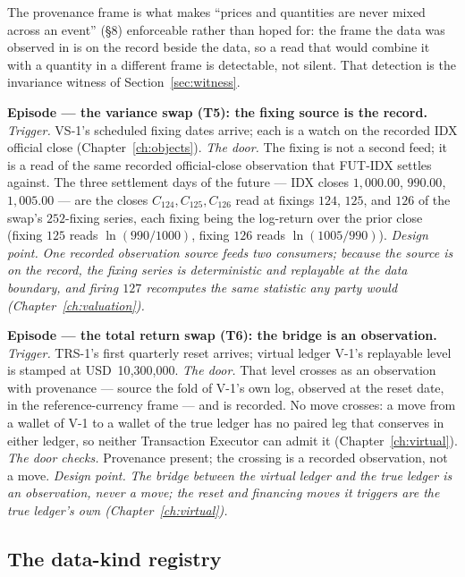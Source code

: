 \documentclass[11pt,a4paper]{article}
\newcommand{\USD}[1]{\mbox{USD~#1}}
\begin{document}
The provenance frame is what makes ``prices and quantities are never mixed across an
event'' (\S 8) enforceable rather than hoped for: the frame the data was observed in is on
the record beside the data, so a read that would combine it with a quantity in a
different frame is detectable, not silent. That detection is the invariance witness of
Section~\ref{sec:witness}.

\medskip\noindent\textbf{Episode --- the variance swap (T5): the fixing source is the
record.}
\emph{Trigger.} VS-1's scheduled fixing dates arrive; each is a watch on the recorded IDX
official close (Chapter~\ref{ch:objects}). \emph{The door.} The fixing is not a second
feed; it is a read of the same recorded official-close observation that FUT-IDX settles
against. The three settlement days of the future --- IDX closes $1{,}000.00$, $990.00$,
$1{,}005.00$ --- are the closes $C_{124}, C_{125}, C_{126}$ read at fixings $124$,
$125$, and $126$ of the swap's $252$-fixing series, each fixing being the log-return
over the prior close (fixing $125$ reads $\ln(990/1000)$, fixing $126$ reads
$\ln(1005/990)$).
\emph{Design point.} \emph{One recorded observation source feeds two consumers; because
the source is on the record, the fixing series is deterministic and replayable at the data
boundary, and firing $127$ recomputes the same statistic any party would
(Chapter~\ref{ch:valuation}).}

\medskip\noindent\textbf{Episode --- the total return swap (T6): the bridge is an
observation.}
\emph{Trigger.} TRS-1's first quarterly reset arrives; virtual ledger V-1's replayable
level is stamped at \USD{10{,}300{,}000}. \emph{The door.} That level crosses as an
observation with provenance --- source the fold of V-1's own log, observed at the reset
date, in the reference-currency frame --- and is recorded. No move crosses: a move from a
wallet of V-1 to a wallet of the true ledger has no paired leg that conserves in either
ledger, so neither Transaction Executor can admit it (Chapter~\ref{ch:virtual}). \emph{The
door checks.} Provenance present; the crossing is a recorded observation, not a move.
\emph{Design point.} \emph{The bridge between the virtual ledger and the true ledger is an
observation, never a move; the reset and financing moves it triggers are the true ledger's
own (Chapter~\ref{ch:virtual}).}

\subsection{The data-kind registry}\label{sec:registry}
\end{document}
